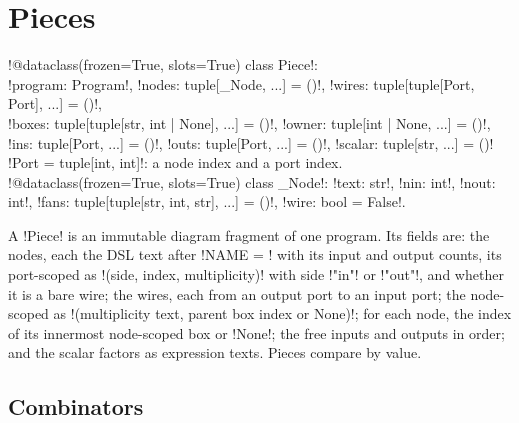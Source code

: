 \section{Pieces}\label{sec:python-api-piece}

\begin{signature}
\py!@dataclass(frozen=True, slots=True) class Piece!:\\
\quad \py!program: Program!, \py!nodes: tuple[_Node, ...] = ()!, \py!wires: tuple[tuple[Port, Port], ...] = ()!,\\
\quad \py!boxes: tuple[tuple[str, int | None], ...] = ()!, \py!owner: tuple[int | None, ...] = ()!,\\
\quad \py!ins: tuple[Port, ...] = ()!, \py!outs: tuple[Port, ...] = ()!, \py!scalar: tuple[str, ...] = ()!\\
\py!Port = tuple[int, int]!: a node index and a port index.\\
\py!@dataclass(frozen=True, slots=True) class _Node!: \py!text: str!, \py!nin: int!, \py!nout: int!, \py!fans: tuple[tuple[str, int, str], ...] = ()!, \py!wire: bool = False!.
\end{signature}

A \py!Piece! is an immutable diagram fragment of one program. Its fields are: the nodes, each the DSL text after \code!NAME = ! with its input and output counts, its port-scoped \bboxes{} as \py!(side, index, multiplicity)! with side \code!"in"! or \code!"out"!, and whether it is a bare wire; the wires, each from an output port to an input port; the node-scoped \bboxes{} as \py!(multiplicity text, parent box index or None)!; for each node, the index of its innermost node-scoped box or \py!None!; the free inputs and outputs in order; and the scalar factors as expression texts. Pieces compare by value.

\subsection{Combinators}

